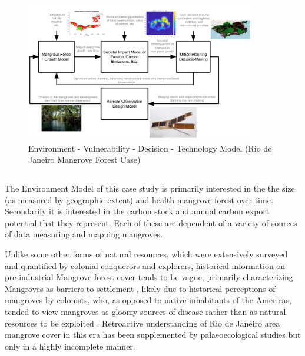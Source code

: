 \begin{figure}[!htb]
\centering
\includegraphics[width=0.9\textwidth]{Figures/chap4/MangroveModelFlow.png}
\caption[EVDT Model (Rio de Janeiro Mangrove Forest Case)]{Environment - Vulnerability - Decision - Technology Model (Rio de Janeiro Mangrove Forest Case)}
\label{fig:rio-evdt-flow}
\end{figure}


\subsection{} \label{sec:rio-evdt-method}

\subsubsection{} \label{sec:rio-evdt-e-method}

The Environment Model of this case study is primarily interested in the the size (as measured by geographic extent) and health mangrove forest over time. Secondarily it is interested in the carbon stock and annual carbon export potential that they represent. Each of these are dependent of a variety of sources of data measuring and mapping mangroves.

Unlike some other forms of natural resources, which were extensively surveyed and quantified by colonial conquerors and explorers, historical information on pre-industrial Mangrove forest cover tends to be vague, primarily characterizing Mangroves as barriers to settlement \cite{amadorBaiaGuanabaraOcupacao2013}, likely due to historical perceptions of mangroves by colonists, who, as opposed to native inhabitants of the Americas, tended to view mangroves as gloomy sources of disease rather than as natural resources to be exploited \cite{friessEcosystemServicesDisservices2016}. Retroactive understanding of Rio de Janeiro area mangrove cover in this era has been supplemented by palaeoecological studies \cite{vilelaLateHoloceneEvolution2014} but only in a highly incomplete manner. 

